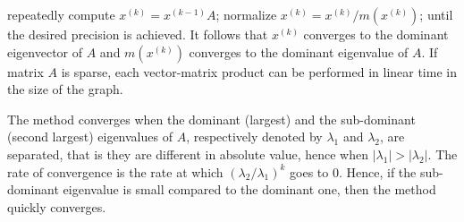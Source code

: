 \documentclass[12pt]{article}
\begin{document}
repeatedly compute $x^{(k)} = x^{(k-1)} A$;
normalize $x^{(k)} = x^{(k)} / m(x^{(k)})$;
until the desired precision is achieved. It follows that $x^{(k)}$ converges to the dominant eigenvector of $A$ and $m(x^{(k)})$ converges to the dominant eigenvalue of $A$. If matrix $A$ is sparse, each vector-matrix product can be performed in linear time in the size of the graph.

The method converges when the dominant (largest) and the sub-dominant (second largest) eigenvalues of $A$, respectively denoted by $\lambda_1$ and $\lambda_2$, are separated, that is they are different in absolute value, hence when $|\lambda_1| > |\lambda_2|$. The rate of convergence is the rate at which $(\lambda_2 / \lambda_1)^k$ goes to $0$. Hence, if the sub-dominant eigenvalue is small compared to the dominant one, then the method quickly converges.


{}






\end{document}
